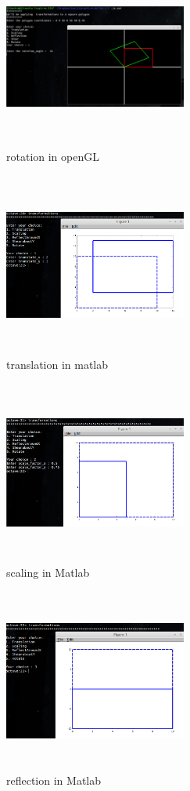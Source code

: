 \begin{figure}[ht!]
\centering
\includegraphics[width=60mm, height=60mm]{rotationOpenGL.png}
\caption{rotation in openGL \label{overflow}}
\end{figure}
\begin{figure}[ht!]
\centering
\includegraphics[width=60mm, height=60mm]{translationMatlab.png}
\caption{translation in matlab \label{overflow}}
\end{figure}
\begin{figure}[ht!]
\centering
\includegraphics[width=60mm, height=60mm]{scalingMatlab.png}
\caption{scaling in Matlab\label{overflow}}
\end{figure}
\begin{figure}[ht!]
\centering
\includegraphics[width=60mm, height=60mm]{reflectionAboutXMatlab.png}
\caption{reflection in Matlab\label{overflow}}
\end{figure}
